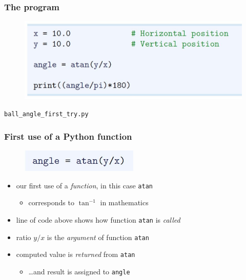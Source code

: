 \documentclass[14pt]{beamer}
\newcommand\red[1]{{\color{red} #1}}
\begin{document}

\begin{frame}[fragile]
\frametitle{The program}

\begin{figure}[ht]
	\centering
	\includegraphics[width=\textwidth]{figures/LLp12}
\end{figure}

\begin{center}
\texttt{ball\_angle\_first\_try.py}
\end{center}

\end{frame}


\begin{frame}[fragile]
\frametitle{First use of a Python function}

\begin{figure}[ht]
	\centering
	\includegraphics[width=0.5\textwidth]{figures/LLp12a}
\end{figure}

\begin{itemize}
	\item our first use of a \red{\emph{function}}, in this case \texttt{atan}
	\begin{itemize}
		\item corresponds to $\tan^{-1}$ in mathematics
	\end{itemize}
	\item line of code above shows how function \texttt{atan} is \red{\emph{called}}
	\item ratio $y/x$ is the \red{\emph{argument}} of function \texttt{atan}
	\item computed value is \red{\emph{returned}} from \texttt{atan}
	\begin{itemize}
		\item \ldots and result is assigned to \texttt{angle}
	\end{itemize}
\end{itemize}

\end{frame}
\end{document}
